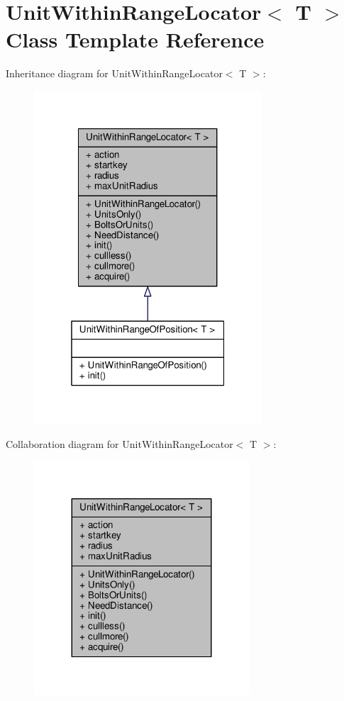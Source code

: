 \hypertarget{classUnitWithinRangeLocator}{}\section{Unit\+Within\+Range\+Locator$<$ T $>$ Class Template Reference}
\label{classUnitWithinRangeLocator}


Inheritance diagram for Unit\+Within\+Range\+Locator$<$ T $>$\+:
\nopagebreak
\begin{figure}[H]
\begin{center}
\leavevmode
\includegraphics[width=241pt]{d6/d63/classUnitWithinRangeLocator__inherit__graph}
\end{center}
\end{figure}


Collaboration diagram for Unit\+Within\+Range\+Locator$<$ T $>$\+:
\nopagebreak
\begin{figure}[H]
\begin{center}
\leavevmode
\includegraphics[width=227pt]{d5/d05/classUnitWithinRangeLocator__coll__graph}
\end{center}
\end{figure}
